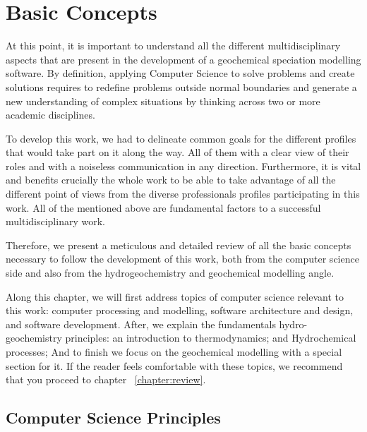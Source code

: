 \documentclass[ppgc,mestrado,english]{iiufrgs}
\begin{document}
\chapter{Basic Concepts}
\label{chapter:basic}

At this point, it is important to understand all the different multidisciplinary aspects that are present in the development of a geochemical speciation modelling software. By definition, applying Computer Science to solve problems and create solutions requires to redefine problems outside normal boundaries and generate a new understanding of complex situations by thinking across two or more academic disciplines. 

To develop this work, we had to delineate common goals for the different profiles that would take part on it along the way. All of them with a clear view of their roles and with a noiseless communication in any direction. Furthermore, it is vital and benefits crucially the whole work to be able to take advantage of all the different point of views from the diverse professionals profiles participating in this work. All of the mentioned above are fundamental factors to a successful multidisciplinary work.

Therefore, we present a meticulous and detailed review of all the basic concepts necessary to follow the development of this work, both from the computer science side and also from the hydrogeochemistry and geochemical modelling angle.

Along this chapter, we will first address topics of computer science relevant to this work: computer processing and modelling, software architecture and design, and software development. After, we explain the fundamentals hydro-geochemistry principles: an introduction to thermodynamics; and Hydrochemical processes; And to finish we focus on the geochemical modelling with a special section for it. If the reader feels comfortable with these topics, we recommend that you proceed to chapter ~\ref{chapter:review}.


\section{Computer Science Principles}
\end{document}
